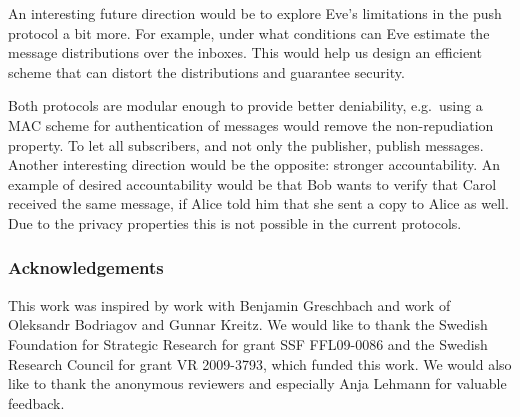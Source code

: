 
An interesting future direction would be to explore Eve's limitations in the 
push protocol a bit more.
For example, under what conditions can Eve estimate the message distributions 
over the inboxes.
This would help us design an efficient scheme that can distort the 
distributions and guarantee security.

Both protocols are modular enough to provide better deniability, e.g.\ using 
a \ac{MAC} scheme for authentication of messages would remove the 
non-repudiation property.
To let all subscribers, and not only the publisher, publish messages.
Another interesting direction would be the opposite: stronger accountability.
An example of desired accountability would be that Bob wants to verify that 
Carol received the same message, if Alice told him that she sent a copy to 
Alice as well.
Due to the privacy properties this is not possible in the current protocols.


\subsubsection{Acknowledgements}

This work was inspired by work with Benjamin Greschbach and work of Oleksandr 
Bodriagov and Gunnar Kreitz.
We would like to thank the Swedish Foundation for Strategic Research for grant 
SSF FFL09-0086 and the Swedish Research Council for grant VR 2009-3793, which 
funded this work.
We would also like to thank the anonymous reviewers and especially Anja Lehmann 
for valuable feedback.


\printbibliography{}

